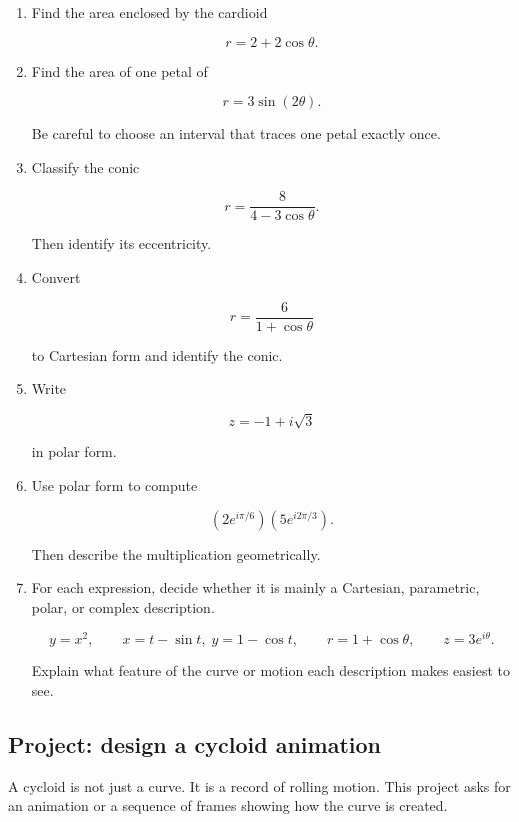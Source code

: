 \begin{enumerate}
\[
r=1+\cos\theta
\]

at

\[
\theta=\frac{\pi}{2}.
\]

\item Find the area enclosed by the cardioid

\[
r=2+2\cos\theta.
\]

\item Find the area of one petal of

\[
r=3\sin(2\theta).
\]

Be careful to choose an interval that traces one petal exactly once.

\item Classify the conic

\[
r=\frac{8}{4-3\cos\theta}.
\]

Then identify its eccentricity.

\item Convert

\[
r=\frac{6}{1+\cos\theta}
\]

to Cartesian form and identify the conic.

\item Write

\[
z=-1+i\sqrt3
\]

in polar form.

\item Use polar form to compute

\[
\left(2e^{i\pi/6}\right)\left(5e^{i2\pi/3}\right).
\]

Then describe the multiplication geometrically.

\item For each expression, decide whether it is mainly a Cartesian, parametric, polar, or
complex description.

\[
y=x^2,
\qquad
x=t-\sin t,\;y=1-\cos t,
\qquad
r=1+\cos\theta,
\qquad
z=3e^{i\theta}.
\]

Explain what feature of the curve or motion each description makes easiest to see.
\end{enumerate}

\subsection{Project: design a cycloid animation}
\label{subsec:project-cycloid-animation}

A cycloid is not just a curve.  It is a record of rolling motion.  This project asks for an
animation or a sequence of frames showing how the curve is created.

